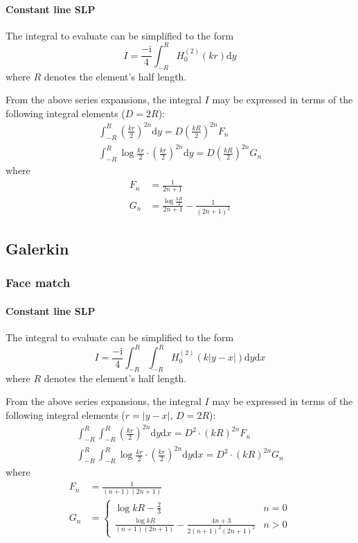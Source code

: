 \documentclass[a4paper,11pt]{article}
\newcommand{\td}{\mathrm{d}}
\newcommand{\ti}{\mathrm{i}}
\begin{document}
\paragraph{Constant line SLP}

The integral to evaluate can be simplified to the form
%
\begin{equation}
I = \frac{-\ti}{4} \int_{-R}^R  H_0^{(2)}(kr)  \td y
\end{equation}
%
where $R$ denotes the element's half length.

From the above series expansions, the integral $I$ may be expressed in terms of the following integral elements ($D = 2R$):
%
\begin{align}
\int_{-R}^R
\left(\frac{kr}{2}\right)^{2n} \td y
= D \left( \frac{kR}{2} \right)^{2n} F_n \\
\int_{-R}^R
\log \frac{kr}{2} \cdot \left(\frac{kr}{2}\right)^{2n} \td y
= D \left(\frac{kR}{2}\right)^{2 n} G_n
\end{align}
%
where
%
\begin{align}
F_n &= \frac{1}{2n+1} \\
G_n &= \frac{\log\frac{kR}{2}} {2 n + 1} - \frac{1}{(2 n + 1)^2}
\end{align}


\subsection{Galerkin}

\subsubsection{Face match}

\paragraph{Constant line SLP}

The integral to evaluate can be simplified to the form
%
\begin{equation}
I = \frac{-\ti}{4} \int_{-R}^{R} \int_{-R}^R  H_0^{(2)}(k|y-x|)  \td y \td x
\end{equation}
%
where $R$ denotes the element's half length.

From the above series expansions, the integral $I$ may be expressed in terms of the following integral elements ($r=|y-x|$, $D = 2R$):
%
\begin{align}
\int_{-R}^{R} \int_{-R}^R  \left(\frac{kr}{2}\right)^{2n}  \td y \td x
= D^2 \cdot (kR)^{2n} F_n
\\
\int_{-R}^{R} \int_{-R}^R  \log \frac{kr}{2} \cdot \left(\frac{kr}{2}\right)^{2n}  \td y \td x
= D^2 \cdot (kR)^{2n} G_n
\end{align}
%
where
%
\begin{align}
F_n &= \frac{1}{(n+1)(2n+1)}
\\
G_n &= \begin{cases}
\log kR - \frac{2}{3} & n = 0 \\
\frac{\log kR}{(n+1)(2n+1)} - \frac{4n+3}{2(n+1)^2(2n+1)^2}& n > 0
\end{cases}
\end{align}
\end{document}

